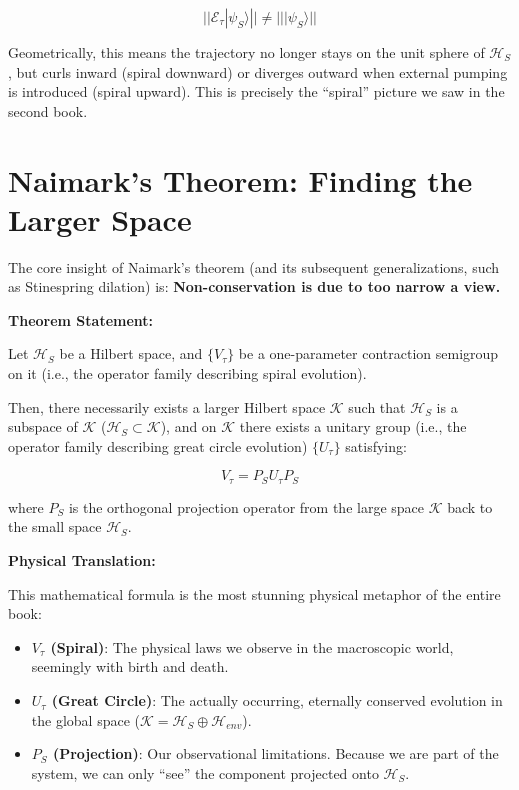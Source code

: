 \[||\mathcal{E}_\tau |\psi_S\rangle || \ne || |\psi_S\rangle ||\]

Geometrically, this means the trajectory no longer stays on the unit sphere of $\mathcal{H}_S$, but curls inward (spiral downward) or diverges outward when external pumping is introduced (spiral upward). This is precisely the ``spiral'' picture we saw in the second book.

\section{Naimark's Theorem: Finding the Larger Space}

The core insight of Naimark's theorem (and its subsequent generalizations, such as Stinespring dilation) is: \textbf{Non-conservation is due to too narrow a view.}

\textbf{Theorem Statement:}

Let $\mathcal{H}_S$ be a Hilbert space, and $\{V_\tau\}$ be a one-parameter contraction semigroup on it (i.e., the operator family describing spiral evolution).

Then, there necessarily exists a larger Hilbert space $\mathcal{K}$ such that $\mathcal{H}_S$ is a subspace of $\mathcal{K}$ ($\mathcal{H}_S \subset \mathcal{K}$), and on $\mathcal{K}$ there exists a unitary group (i.e., the operator family describing great circle evolution) $\{U_\tau\}$ satisfying:

\[V_\tau = P_S U_\tau P_S\]

where $P_S$ is the orthogonal projection operator from the large space $\mathcal{K}$ back to the small space $\mathcal{H}_S$.

\textbf{Physical Translation:}

This mathematical formula is the most stunning physical metaphor of the entire book:

\begin{itemize}
\item \textbf{$V_\tau$ (Spiral)}: The physical laws we observe in the macroscopic world, seemingly with birth and death.

\item \textbf{$U_\tau$ (Great Circle)}: The actually occurring, eternally conserved evolution in the global space ($\mathcal{K} = \mathcal{H}_S \oplus \mathcal{H}_{env}$).

\item \textbf{$P_S$ (Projection)}: Our observational limitations. Because we are part of the system, we can only ``see'' the component projected onto $\mathcal{H}_S$.
\end{itemize}

